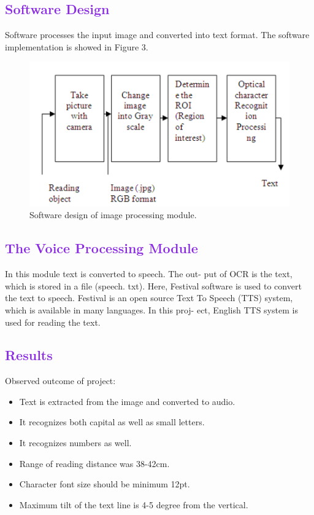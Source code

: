 \documentclass[a4paper]{article}
\begin{document}
\textcolor{BlueViolet}
{\subsection{Software Design}}
\small
Software processes the input image and converted into text format. The software implementation is showed in Figure 3.
\vspace{5mm}
\begin{figure}[h]
    \centering
    \includegraphics[scale = 1]{img3.png}
    \caption{Software design of image processing module.}
    \label{fig:enter-label}
\end{figure}
\vspace{5mm}

\textcolor{BlueViolet}
{\subsection{The Voice Processing Module}}
\small
In this module text is converted to speech. The out- put of OCR is the text, which is stored in a file (speech. txt). Here, Festival software is used to convert the text to speech. Festival is an open source Text To Speech (TTS) system, which is available in many languages. In this proj- ect, English TTS system is used for reading the text.

\vspace{5mm}
\textcolor{BlueViolet}
{\section{Results}}
Observed outcome of project:\\
\begin{itemize}
    \item Text is extracted from the image and converted to audio.
    \item It recognizes both capital as well as small letters.
    \item It recognizes numbers as well.
    \item Range of reading distance was 38-42cm.
    \item Character font size should be minimum 12pt.
    \item Maximum tilt of the text line is 4-5 degree from the vertical.
\end{itemize}
\end{document}
